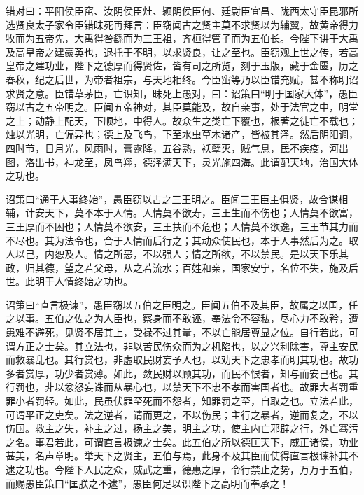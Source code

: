 \documentclass[12pt,UTF8]{ctexbook}
\begin{document}
错对曰：平阳侯臣窋、汝阴侯臣灶、颍阴侯臣何、廷尉臣宜昌、陇西太守臣昆邪所选贤良太子家令臣错昧死再拜言：臣窃闻古之贤主莫不求贤以为辅翼，故黄帝得力牧而为五帝先，大禹得咎繇而为三王祖，齐桓得管子而为五伯长。今陛下讲于大禹及高皇帝之建豪英也，退托于不明，以求贤良，让之至也。臣窃观上世之传，若高皇帝之建功业，陛下之德厚而得贤佐，皆有司之所览，刻于玉版，藏于金匮，历之春秋，纪之后世，为帝者祖宗，与天地相终。今臣窋等乃以臣错充赋，甚不称明诏求贤之意。臣错草茅臣，亡识知，昧死上愚对，曰：诏策曰“明于国家大体”，愚臣窃以古之五帝明之。臣闻五帝神对，其臣莫能及，故自亲事，处于法官之中，明堂之上；动静上配天，下顺地，中得人。故众生之类亡下覆也，根著之徒亡不载也；烛以光明，亡偏异也；德上及飞鸟，下至水虫草木诸产，皆被其泽。然后阴阳调，四时节，日月光，风雨时，膏露降，五谷熟，袄孽灭，贼气息，民不疾疫，河出图，洛出书，神龙至，凤鸟翔，德泽满天下，灵光施四海。此谓配天地，治国大体之功也。



诏策曰“通于人事终始”，愚臣窃以古之三王明之。臣闻三王臣主俱贤，故合谋相辅，计安天下，莫不本于人情。人情莫不欲寿，三王生而不伤也；人情莫不欲富，三王厚而不困也；人情莫不欲安，三王扶而不危也；人情莫不欲逸，三王节其力而不尽也。其为法令也，合于人情而后行之；其动众使民也，本于人事然后为之。取人以己，内恕及人。情之所恶，不以强人；情之所欲，不以禁民。是以天下乐其政，归其德，望之若父母，从之若流水；百姓和亲，国家安宁，名位不失，施及后世。此明于人情终始之功也。



诏策曰“直言极谏”，愚臣窃以五伯之臣明之。臣闻五伯不及其臣，故属之以国，任之以事。五伯之佐之为人臣也，察身而不敢诬，奉法令不容私，尽心力不敢矜，遭患难不避死，见贤不居其上，受禄不过其量，不以亡能居尊显之位。自行若此，可谓方正之士矣。其立法也，非以苦民伤众而为之机陷也，以之兴利除害，尊主安民而救暴乱也。其行赏也，非虚取民财妄予人也，以劝天下之忠孝而明其功也。故功多者赏厚，功少者赏薄。如此，敛民财以顾其功，而民不恨者，知与而安己也。其行罚也，非以忿怒妄诛而从暴心也，以禁天下不忠不孝而害国者也。故罪大者罚重罪小者罚轻。如此，民虽伏罪至死而不怨者，知罪罚之至，自取之也。立法若此，可谓平正之吏矣。法之逆者，请而更之，不以伤民；主行之暴者，逆而复之，不以伤国。救主之失，补主之过，扬主之美，明主之功，使主内亡邪辟之行，外亡骞污之名。事君若此，可谓直言极谏之士矣。此五伯之所以德匡天下，威正诸侯，功业甚美，名声章明。举天下之贤主，五伯与焉，此身不及其臣而使得直言极谏补其不逮之功也。今陛下人民之众，威武之重，德惠之厚，令行禁止之势，万万于五伯，而赐愚臣策曰“匡朕之不逮”，愚臣何足以识陛下之高明而奉承之！
\end{document}
